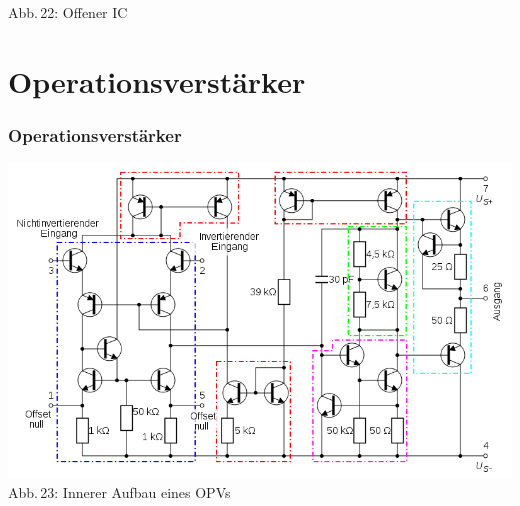 \begin{frame}
\begin{minipage}{0.5\textwidth}
\begin{center}
	{\tiny Abb.\,22: Offener IC~\cite{wpen}}
\end{center}
\end{minipage}
\end{frame}

\section*{Operations\-verstärker}

\begin{frame}
  \frametitle{Operationsverstärker}
  \begin{center}
    \includegraphics[width=\textwidth,height=.85\textheight,keepaspectratio]{a06/OPV-intern.png}\\
    {\tiny Abb.\,23: Innerer Aufbau eines OPVs~\cite{wp}}
  \end{center}
\end{frame}

